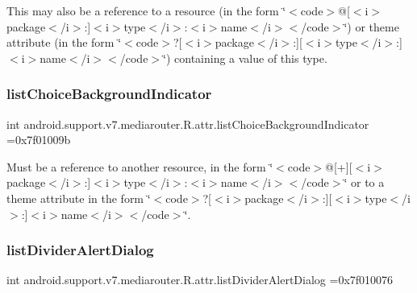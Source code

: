 This may also be a reference to a resource (in the form \char`\"{}$<$code$>$@\mbox{[}$<$i$>$package$<$/i$>$\+:\mbox{]}$<$i$>$type$<$/i$>$\+:$<$i$>$name$<$/i$>$$<$/code$>$\char`\"{}) or theme attribute (in the form \char`\"{}$<$code$>$?\mbox{[}$<$i$>$package$<$/i$>$\+:\mbox{]}\mbox{[}$<$i$>$type$<$/i$>$\+:\mbox{]}$<$i$>$name$<$/i$>$$<$/code$>$\char`\"{}) containing a value of this type. \mbox{\label{classandroid_1_1support_1_1v7_1_1mediarouter_1_1R_1_1attr_a580e0b8b5fb7b57b904717752665ed0e}} 
\subsubsection{\texorpdfstring{list\+Choice\+Background\+Indicator}{listChoiceBackgroundIndicator}}
{\footnotesize\ttfamily int android.\+support.\+v7.\+mediarouter.\+R.\+attr.\+list\+Choice\+Background\+Indicator =0x7f01009b\hspace{0.3cm}{\ttfamily [static]}}

Must be a reference to another resource, in the form \char`\"{}$<$code$>$@\mbox{[}+\mbox{]}\mbox{[}$<$i$>$package$<$/i$>$\+:\mbox{]}$<$i$>$type$<$/i$>$\+:$<$i$>$name$<$/i$>$$<$/code$>$\char`\"{} or to a theme attribute in the form \char`\"{}$<$code$>$?\mbox{[}$<$i$>$package$<$/i$>$\+:\mbox{]}\mbox{[}$<$i$>$type$<$/i$>$\+:\mbox{]}$<$i$>$name$<$/i$>$$<$/code$>$\char`\"{}. \mbox{\label{classandroid_1_1support_1_1v7_1_1mediarouter_1_1R_1_1attr_a99270b2c4e90683ae9ac0c8d7ff8d52e}} 
\subsubsection{\texorpdfstring{list\+Divider\+Alert\+Dialog}{listDividerAlertDialog}}
{\footnotesize\ttfamily int android.\+support.\+v7.\+mediarouter.\+R.\+attr.\+list\+Divider\+Alert\+Dialog =0x7f010076\hspace{0.3cm}{\ttfamily [static]}}

